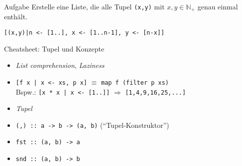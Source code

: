 \documentclass{beamer}
\begin{document}
\begin{frame}{Aufgabe}
    Erstelle eine Liste, die alle Tupel \texttt{(x,y)} mit $x,y \in \mathbb{N}_+$ genau einmal enthält.
    \pause
    
    \texttt{[(x,y)|n <- [1..], x <- [1..n-1], y <- [n-x]]}
\end{frame}

\begin{frame}{Cheatsheet: Tupel und Konzepte}
  \begin{itemize}
    \item \emph{List comprehension}, \emph{Laziness}
    \item \texttt{[f x | x <- xs, p x]} $\equiv$ \texttt{map f (filter p xs)}\\
      Bspw.: \texttt{[x * x | x <- [1..]]} $\Rightarrow$ \texttt{[1,4,9,16,25,...]}
    \item \emph{Tupel}
    \item \texttt{(,) :: a -> b -> (a, b)} (\enquote{Tupel-Konstruktor})
    \item \texttt{fst :: (a, b) -> a}
    \item \texttt{snd :: (a, b) -> b}
  \end{itemize}
\end{frame}
\end{document}
